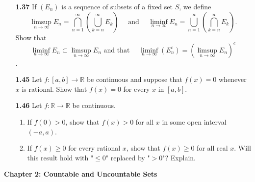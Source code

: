 \documentclass[12pt]{amsart}
\def\RR{{\mathbb R}}
\begin{document}
\begin{enumerate}
\item[\bf 1.37] If $(E_n)$ is a sequence of subsets of a fixed set $S$, we define $$\limsup_{n\to\infty}E_n=\bigcap_{n=1}^\infty \left(\bigcup_{k=n}^{\infty} E_k\right) \quad\text{ and }\quad \liminf_{n\to\infty}E_n=\bigcup_{n=1}^\infty\left(\bigcap_{k=n}^\infty E_k\right).$$ Show that $$\liminf_{n\to\infty}E_n\subset \limsup_{n\to\infty}E_n \text{ and that } \quad \liminf_{n\to\infty}\left(E^c_n\right)=\left(\limsup_{n\to\infty}E_n \right)^c$$.

\bigskip

\item[\bf 1.45] Let $f:[a,b]\to\RR$ be continuous and suppose that $f(x)=0$ whenever $x$ is rational. Show that $f(x)=0$ for every $x$ in $[a,b]$.

\bigskip

\item[\bf 1.46] Let $f:\RR\to\RR$ be continuous. 
	\begin{enumerate}[label={\bf (\alph*)}]
	\item If $f(0)>0$, show that $f(x)>0$ for all $x$ in some open interval $(-a, a)$.
	\smallskip
	\item If $f(x)\geq 0$ for every rational $x$, show that $f(x)\geq 0$ for all real $x$. Will this result hold with "$\leq 0$" replaced by "$>0$"? Explain.
	\end{enumerate}
\end{enumerate}

{\bf Chapter 2: Countable and Uncountable Sets}

\bigskip
\end{document}
